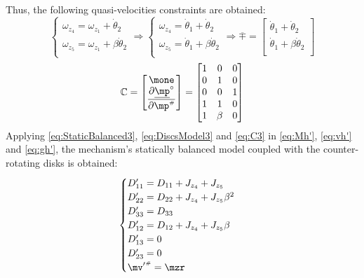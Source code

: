 \documentclass[a4paper,11pt,brazil,fleqn]{article}
\begin{document}
Thus, the following quasi-velocities constraints are obtained:
\begin{equation}\label{eq:Quasi-velocitiesConstraints3}
\begin{cases}
\omega_{z_4} = \omega_{z_1} + \dot{\theta}_2 \\
\omega_{z_5} = \omega_{z_1} + \beta\dot{\theta}_2 \\
\end{cases}
\Rightarrow
\begin{cases}
\omega_{z_4} = \dot{\theta}_1 + \dot{\theta}_2 \\
\omega_{z_5} = \dot{\theta}_1 + \beta\dot{\theta}_2 \\
\end{cases}
\Rightarrow
\overline{\mp} = 
\begin{bmatrix}
\dot{\theta}_1 + \dot{\theta}_2 \\
\dot{\theta}_1 + \beta\dot{\theta}_2 \\
\end{bmatrix}
\end{equation}
\begin{equation}\label{eq:C3}
\mC =
\begin{bmatrix}
\mone \\
\displaystyle\frac{\partial \underline{\mp}^\circ}{\partial \mp\ssh}
\end{bmatrix}  =
\begin{bmatrix}
1 & 0 & 0 \\
0 & 1 & 0 \\
0 & 0 & 1 \\
1 & 1     & 0 \\
1 & \beta & 0 \\
\end{bmatrix} 
\end{equation}
Applying \eqref{eq:StaticBalanced3}, \eqref{eq:DiscsModel3} and \eqref{eq:C3} in \eqref{eq:Mh'}, \eqref{eq:vh'} and \eqref{eq:gh'}, the mechanism's statically balanced model coupled with the counter-rotating disks is obtained:
\begin{equation}\label{eq:CoupledDynamics3}
\begin{cases}
D'_{11} = D_{11} + J_{z_4} + J_{z_5} \\
D'_{22} = D_{22} + J_{z_4} + J_{z_5} \beta^2 \\
D'_{33} = D_{33} \\
D'_{12} = D_{12} + J_{z_4} + J_{z_5} \beta \\
D'_{13} = 0 \\
D'_{23} = 0\\
{\mv'}\ssh = \mzr \\
\end{cases}
\end{equation}
\end{document}
